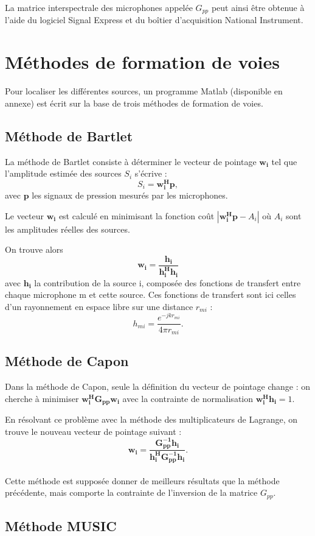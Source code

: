 \documentclass[a4paper]{article}
\renewcommand{\b}[1]{\boldsymbol{#1}}
\begin{document}
La matrice interspectrale des microphones appelée $G_{pp}$ peut ainsi être obtenue à l'aide du logiciel Signal Express et du boîtier d'acquisition National Instrument.


\section{Méthodes de formation de voies}

Pour localiser les différentes sources, un programme Matlab (disponible en annexe) est écrit sur la base de trois méthodes de formation de voies. 
\subsection{Méthode de Bartlet}

La méthode de Bartlet consiste à déterminer le vecteur de pointage $\b{w_i}$ tel que l'amplitude estimée des sources $S_i$ s'écrive : $$S_i=\b{w_{i}^{H}p},$$ avec $\b{p}$ les signaux de pression mesurés par les microphones.

Le vecteur $\b{w_i}$ est calculé en minimisant la fonction coût $|\b{w_{i}^{H}p}-A_i|$ où $A_{i}$ sont les amplitudes réelles des sources.

On trouve alors $$\b{w_{i}}=\b{\frac{h_i}{h_{i}^{H}h_{i}}}$$ avec $\b{h_i}$ la contribution de la source i, composée des fonctions de transfert entre chaque microphone m et cette source. Ces fonctions de transfert sont ici celles d'un rayonnement en espace libre sur une distance $r_{mi}$ : $$ h_{mi}=\frac{e^{-jkr_{mi}}}{4\pi r_{mi}}.$$


\subsection{Méthode de Capon}

Dans la méthode de Capon, seule la définition du vecteur de pointage change : on cherche à minimiser $\b{w_{i}^{H}G_{pp}w_{i}}$ avec la contrainte de normalisation $\b{w_{i}^{H}h_i}=1$. 

En résolvant ce problème avec la méthode des multiplicateurs de Lagrange, on trouve le nouveau vecteur de pointage suivant : $$\b{w_i=\frac{G_{pp}^{-1}h_{i}}{h_{i}^{H}G_{pp}^{-1}h_{i}}}.$$\\

Cette méthode est supposée donner de meilleurs résultats que la méthode précédente, mais comporte la contrainte de l'inversion de la matrice $G_{pp}$.

\subsection{Méthode MUSIC}
\end{document}
